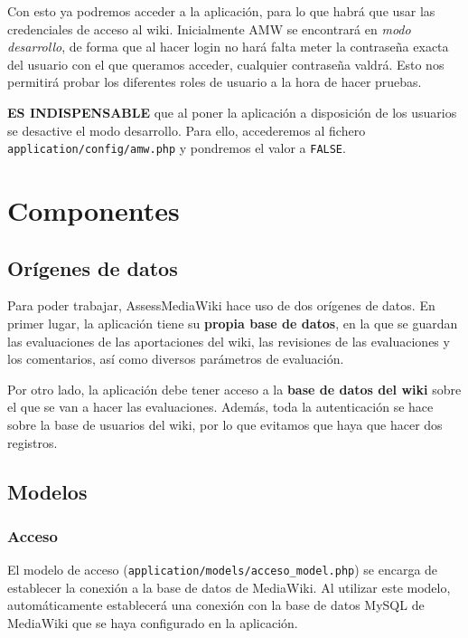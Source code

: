 \documentclass[11pt]{article}
\begin{document}
Con esto ya podremos acceder a la aplicación, para lo que habrá que usar las
credenciales de acceso al wiki. Inicialmente AMW se encontrará en \textit{modo
  desarrollo}, de forma que al hacer login no hará falta meter la contraseña
exacta del usuario con el que queramos acceder, cualquier contraseña
valdrá. Esto nos permitirá probar los diferentes roles de usuario a la hora de
hacer pruebas.

\textbf{ES INDISPENSABLE} que al poner la aplicación a disposición de los
usuarios se desactive el modo desarrollo. Para ello, accederemos al fichero
\texttt{application/config/amw.php} y pondremos el valor a \texttt{FALSE}.


\section{Componentes }

\subsection{Orígenes de datos}

Para poder trabajar, AssessMediaWiki hace uso de dos orígenes de datos. En
primer lugar, la aplicación tiene su \textbf{propia base de datos}, en la que se
guardan las evaluaciones de las aportaciones del wiki, las revisiones de las
evaluaciones y los comentarios, así como diversos parámetros de evaluación.

Por otro lado, la aplicación debe tener acceso a la \textbf{base de datos del
  wiki} sobre el que se van a hacer las evaluaciones. Además, toda la
autenticación se hace sobre la base de usuarios del wiki, por lo que evitamos
que haya que hacer dos registros.

\subsection{Modelos}

\subsubsection{Acceso}

El modelo de acceso (\texttt{application/models/acceso\_model.php}) se encarga de
establecer la conexión a la base de datos de MediaWiki. Al utilizar este modelo,
automáticamente establecerá una conexión con la base de datos MySQL de MediaWiki
que se haya configurado en la aplicación.
\end{document}
